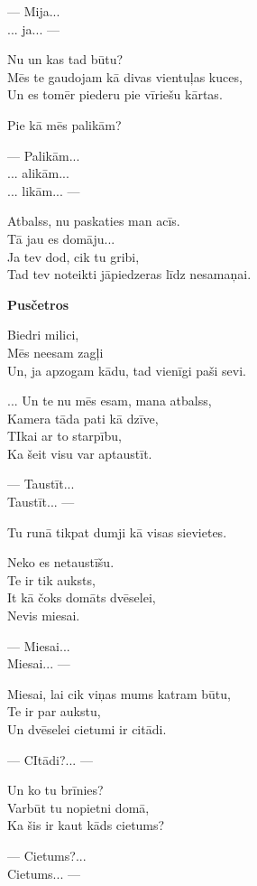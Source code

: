 \documentclass[14pt]{extarticle}
\begin{document}
--- Mija...\\
... ja... ---

Nu un kas tad būtu?\\
Mēs te gaudojam kā divas vientuļas kuces,\\
Un es tomēr piederu pie vīriešu kārtas.

Pie kā mēs palikām?

--- Palikām...\\
... alikām...\\
... likām... ---

Atbalss, nu paskaties man acīs.\\
Tā jau es domāju...\\
Ja tev dod, cik tu gribi,\\
Tad tev noteikti jāpiedzeras līdz nesamaņai.



\newpage

{\bf Pusčetros}

Biedri milici,\\
Mēs neesam zagļi\\
Un, ja apzogam kādu, tad vienīgi paši sevi.

... Un te nu mēs esam, mana atbalss,\\
Kamera tāda pati kā dzīve,\\
TIkai ar to starpību,\\
Ka šeit visu var aptaustīt.

--- Taustīt...\\
Taustīt... ---

Tu runā tikpat dumji kā visas sievietes.

Neko es netaustīšu.\\
Te ir tik auksts,\\
It kā čoks domāts dvēselei,\\
Nevis miesai.

--- Miesai...\\
Miesai... ---

Miesai, lai cik viņas mums katram būtu,\\
Te ir par aukstu,\\
Un dvēselei cietumi ir citādi.

--- CItādi?... ---

Un ko tu brīnies?\\
Varbūt tu nopietni domā,\\
Ka šis ir kaut kāds cietums?

--- Cietums?...\\
Cietums... ---
\end{document}
